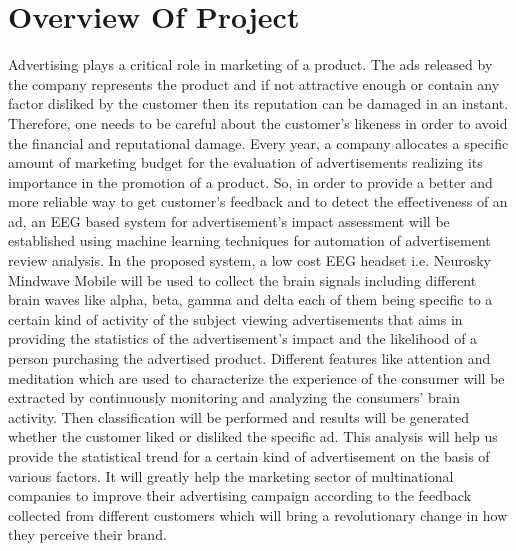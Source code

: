\documentclass[a4paper, 12pt, oneside]{uet_thesis}
\begin{document}
\section{Overview Of Project}
Advertising plays a critical role in marketing of a product. The ads released by the company represents the product and if not attractive enough or contain any factor disliked by the customer then its reputation can be damaged in an instant. Therefore, one needs to be careful about the customer’s likeness in order to avoid the financial and reputational damage. Every year, a company allocates a specific amount of marketing budget for the evaluation of advertisements realizing its importance in the promotion of a product. So, in order to provide a better and more reliable way to get customer’s feedback and to detect the effectiveness of an ad, an EEG based system for advertisement’s impact assessment will be established using machine learning techniques for automation of advertisement review analysis. In the proposed system, a low cost EEG headset i.e. Neurosky Mindwave Mobile will be used to collect the brain signals including different brain waves like alpha, beta, gamma and delta each of them being specific to a certain kind of activity of the subject viewing advertisements that aims in providing the statistics of the advertisement's impact and the likelihood of a person purchasing the advertised product. Different features like attention and meditation which are used to characterize the experience of the consumer will be extracted by continuously monitoring and analyzing the consumers’ brain activity. Then classification will be performed and results will be generated whether the customer liked or disliked the specific ad. This analysis will help us provide the statistical trend for a certain kind of advertisement on the basis of various factors. It will greatly help the marketing sector of multinational companies to improve their advertising campaign according to the feedback collected from different customers which will bring a revolutionary change in how they perceive their brand.
\end{document}
